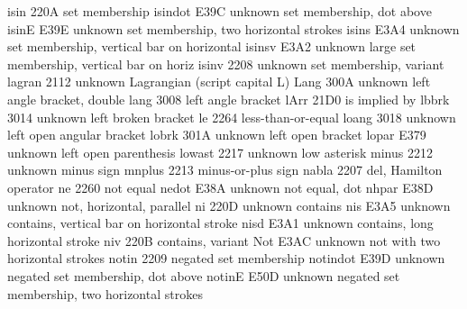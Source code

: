  isin                             220A {\in} set membership
 isindot                          E39C {unknown} set membership, dot above
 isinE                            E39E {unknown} set membership, two horizontal strokes
 isins                            E3A4 {unknown} set membership, vertical bar on horizontal
 isinsv                           E3A2 {unknown} large set membership, vertical bar on horiz
 isinv                            2208 {unknown} set membership, variant
 lagran                           2112 {unknown} Lagrangian (script capital L)
 Lang                             300A {unknown} left angle bracket, double
 lang                             3008 {\langle} left angle bracket
 lArr                             21D0 {\Leftarrow} is implied by
 lbbrk                            3014 {unknown} left broken bracket
 le                               2264 {\leq} less-than-or-equal
 loang                            3018 {unknown} left open angular bracket
 lobrk                            301A {unknown} left open bracket
 lopar                            E379 {unknown} left open parenthesis
 lowast                           2217 {unknown} low asterisk
 minus                            2212 {unknown} minus sign
 mnplus                           2213 {\mp} minus-or-plus sign
 nabla                            2207 {\nabla} del, Hamilton operator
 ne                               2260 {\ne} not equal
 nedot                            E38A {unknown} not equal, dot
 nhpar                            E38D {unknown} not, horizontal, parallel
 ni                               220D {unknown} contains
 nis                              E3A5 {unknown} contains, vertical bar on horizontal stroke
 nisd                             E3A1 {unknown} contains, long horizontal stroke
 niv                              220B {\ni} contains, variant
 Not                              E3AC {unknown} not with two horizontal strokes
 notin                            2209 {\notin} negated set membership
 notindot                         E39D {unknown} negated set membership, dot above
 notinE                           E50D {unknown} negated set membership, two horizontal strokes
